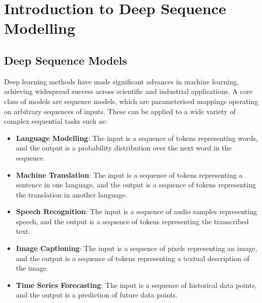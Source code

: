 \documentclass[12pt,a4paper]{report}
\begin{document}
\chapter{Introduction to Deep Sequence Modelling}

\section{Deep Sequence Models}
Deep learning methods have made significant advances in machine learning, achieving widespread success across scientific and industrial applications. A core class of models are sequence models, which are parameterised mappings operating on arbitrary sequences of inputs. These can be applied to a wide variety of complex sequential tasks such as:
\begin{itemize}
    \item \textbf{Language Modelling}: The input is a sequence of tokens representing words, and the output is a probability distribution over the next word in the sequence.
    \item \textbf{Machine Translation}: The input is a sequence of tokens representing a sentence in one language, and the output is a sequence of tokens representing the translation in another language.
    \item \textbf{Speech Recognition}: The input is a sequence of audio samples representing speech, and the output is a sequence of tokens representing the transcribed text.
    \item \textbf{Image Captioning}: The input is a sequence of pixels representing an image, and the output is a sequence of tokens representing a textual description of the image.
    \item \textbf{Time Series Forecasting}: The input is a sequence of historical data points, and the output is a prediction of future data points.
\end{itemize}
\end{document}
